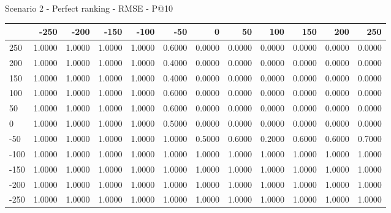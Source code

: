 Scenario 2 - Perfect ranking - RMSE - P@10
\begin{tabular}{lrrrrrrrrrrr}
\toprule
{} &   -250 &   -200 &   -150 &   -100 &   -50  &    0   &    50  &    100 &    150 &    200 &    250 \\
\midrule
 250 & 1.0000 & 1.0000 & 1.0000 & 1.0000 & 0.6000 & 0.0000 & 0.0000 & 0.0000 & 0.0000 & 0.0000 & 0.0000 \\
 200 & 1.0000 & 1.0000 & 1.0000 & 1.0000 & 0.4000 & 0.0000 & 0.0000 & 0.0000 & 0.0000 & 0.0000 & 0.0000 \\
 150 & 1.0000 & 1.0000 & 1.0000 & 1.0000 & 0.4000 & 0.0000 & 0.0000 & 0.0000 & 0.0000 & 0.0000 & 0.0000 \\
 100 & 1.0000 & 1.0000 & 1.0000 & 1.0000 & 0.6000 & 0.0000 & 0.0000 & 0.0000 & 0.0000 & 0.0000 & 0.0000 \\
 50  & 1.0000 & 1.0000 & 1.0000 & 1.0000 & 0.6000 & 0.0000 & 0.0000 & 0.0000 & 0.0000 & 0.0000 & 0.0000 \\
 0   & 1.0000 & 1.0000 & 1.0000 & 1.0000 & 0.5000 & 0.0000 & 0.0000 & 0.0000 & 0.0000 & 0.0000 & 0.0000 \\
-50  & 1.0000 & 1.0000 & 1.0000 & 1.0000 & 1.0000 & 0.5000 & 0.6000 & 0.2000 & 0.6000 & 0.6000 & 0.7000 \\
-100 & 1.0000 & 1.0000 & 1.0000 & 1.0000 & 1.0000 & 1.0000 & 1.0000 & 1.0000 & 1.0000 & 1.0000 & 1.0000 \\
-150 & 1.0000 & 1.0000 & 1.0000 & 1.0000 & 1.0000 & 1.0000 & 1.0000 & 1.0000 & 1.0000 & 1.0000 & 1.0000 \\
-200 & 1.0000 & 1.0000 & 1.0000 & 1.0000 & 1.0000 & 1.0000 & 1.0000 & 1.0000 & 1.0000 & 1.0000 & 1.0000 \\
-250 & 1.0000 & 1.0000 & 1.0000 & 1.0000 & 1.0000 & 1.0000 & 1.0000 & 1.0000 & 1.0000 & 1.0000 & 1.0000 \\
\bottomrule
\end{tabular}

